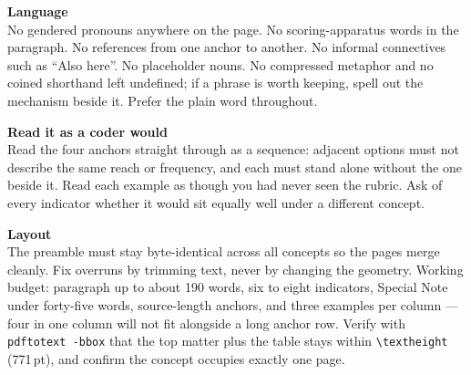 \documentclass[10pt,a4paper]{article}
\begin{document}
\vspace{2.5mm}
{\bfseries Language}\\[1mm]
No gendered pronouns anywhere on the page. No scoring-apparatus words in the paragraph. No references from
one anchor to another. No informal connectives such as ``Also here''. No placeholder nouns. No compressed
metaphor and no coined shorthand left undefined; if a phrase is worth keeping, spell out the mechanism beside
it. Prefer the plain word throughout.
 
\vspace{2.5mm}
{\bfseries Read it as a coder would}\\[1mm]
Read the four anchors straight through as a sequence: adjacent options must not describe the same reach or
frequency, and each must stand alone without the one beside it. Read each example as though you had never
seen the rubric. Ask of every indicator whether it would sit equally well under a different concept.
 
\vspace{2.5mm}
{\bfseries Layout}\\[1mm]
The preamble must stay byte-identical across all concepts so the pages merge cleanly. Fix overruns by
trimming text, never by changing the geometry. Working budget: paragraph up to about 190 words, six to eight
indicators, Special Note under forty-five words, source-length anchors, and three examples per column ---
four in one column will not fit alongside a long anchor row. Verify with \texttt{pdftotext -bbox} that the top
matter plus the table stays within \texttt{\textbackslash textheight} (771\,pt), and confirm the concept
occupies exactly one page.
\normalsize

 
\end{document}
